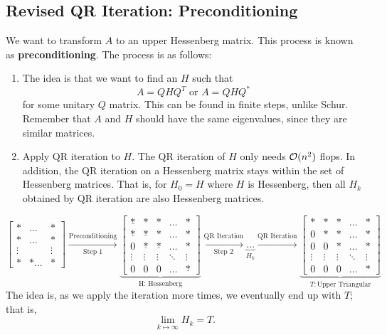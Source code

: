 \documentclass[letterpaper]{article}
\newcommand{\0}{\mathbf{0}}
\begin{document}
\subsection{Revised QR Iteration: Preconditioning}
We want to transform $A$ to an upper Hessenberg matrix. This process is known as \textbf{preconditioning}. The process is as follows: 
\begin{enumerate}
    \item The idea is that we want to find an $H$ such that \[A = QHQ^T \text{ or } A = QHQ^{*}\]
    for some unitary $Q$ matrix. This can be found in finite steps, unlike Schur. Remember that $A$ and $H$ should have the same eigenvalues, since they are similar matrices. 
    \item Apply QR iteration to $H$. The QR iteration of $H$ only needs $\mathcal{O}(n^2)$ flops. In addition, the QR iteration on a Hessenberg matrix stays within the set of Hessenberg matrices. That is, for $H_0 = H$ where $H$ is Hessenberg, then all $H_k$ obtained by QR iteration are also Hessenberg matrices. 
\end{enumerate}

\[\begin{bmatrix}
    * & \hdots & * \\ 
    * & \hdots & * \\ 
    \vdots & & \vdots \\ 
    * & * \hdots & *
\end{bmatrix} \xrightarrow[\text{Step 1}]{\text{Preconditioning}} \underbrace{\begin{bmatrix}
    \underline{*} & * & * & \hdots & * \\
    \underline{*} & \underline{*} & * & \hdots & * \\ 
    0 & \underline{*} & \underline{*} & \hdots & * \\ 
    \vdots & \vdots & \vdots & \ddots & \vdots \\ 
    0 & 0 & 0 & \hdots & \underline{*} 
    \end{bmatrix}}_{\text{H: Hessenberg}} \xrightarrow[\text{Step 2}]{\text{QR Iteration}} \underbrace{\dots}_{H_k} \xrightarrow{\text{QR Iteration}} \underbrace{\begin{bmatrix}
        * & * & * & \hdots & * \\
        0 & * & * & \hdots & * \\ 
        0 & 0 & * & \hdots & * \\ 
        \vdots & \vdots & \vdots & \ddots & \vdots \\ 
        0 & 0 & 0 & \hdots & *
\end{bmatrix}}_{T: \text{Upper Triangular}}\]
The idea is, as we apply the iteration more times, we eventually end up with $T$; that is, 
\[\lim_{k \mapsto \infty} H_k = T.\]
\end{document}
